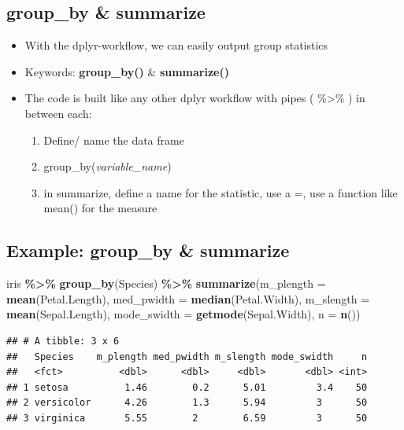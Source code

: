 \documentclass[
]{book}
\newenvironment{Shaded}{\begin{snugshade}}{\end{snugshade}}
\newcommand{\AttributeTok}[1]{\textcolor[rgb]{0.13,0.29,0.53}{#1}}
\newcommand{\FunctionTok}[1]{\textcolor[rgb]{0.13,0.29,0.53}{\textbf{#1}}}
\newcommand{\NormalTok}[1]{#1}
\newcommand{\SpecialCharTok}[1]{\textcolor[rgb]{0.81,0.36,0.00}{\textbf{#1}}}
\providecommand{\tightlist}{%
  \setlength{\itemsep}{0pt}\setlength{\parskip}{0pt}}
\begin{document}
\subsection{group\_by \& summarize}\label{group_by-summarize-1}

\begin{itemize}
\tightlist
\item
  With the dplyr-workflow, we can easily output group statistics
\item
  Keywords: \textbf{group\_by()} \& \textbf{summarize()}
\item
  The code is built like any other dplyr workflow with pipes ( \%\textgreater\% ) in between each:

  \begin{enumerate}
  \def\labelenumi{\arabic{enumi}.}
  \tightlist
  \item
    Define/ name the data frame
  \item
    group\_by(\emph{variable\_name})
  \item
    in summarize, define a name for the statistic, use a =, use a function like mean() for the measure
  \end{enumerate}
\end{itemize}

\subsection{Example: group\_by \& summarize}\label{example-group_by-summarize-1}

\begin{Shaded}
\begin{Highlighting}[]
\NormalTok{iris }\SpecialCharTok{\%\textgreater{}\%} 
  \FunctionTok{group\_by}\NormalTok{(Species) }\SpecialCharTok{\%\textgreater{}\%} 
  \FunctionTok{summarize}\NormalTok{(}\AttributeTok{m\_plength =} \FunctionTok{mean}\NormalTok{(Petal.Length),}
            \AttributeTok{med\_pwidth =} \FunctionTok{median}\NormalTok{(Petal.Width),}
            \AttributeTok{m\_slength =} \FunctionTok{mean}\NormalTok{(Sepal.Length),}
            \AttributeTok{mode\_swidth =} \FunctionTok{getmode}\NormalTok{(Sepal.Width),}
            \AttributeTok{n =} \FunctionTok{n}\NormalTok{())}
\end{Highlighting}
\end{Shaded}

\begin{verbatim}
## # A tibble: 3 x 6
##   Species    m_plength med_pwidth m_slength mode_swidth     n
##   <fct>          <dbl>      <dbl>     <dbl>       <dbl> <int>
## 1 setosa          1.46        0.2      5.01         3.4    50
## 2 versicolor      4.26        1.3      5.94         3      50
## 3 virginica       5.55        2        6.59         3      50
\end{verbatim}
\end{document}
